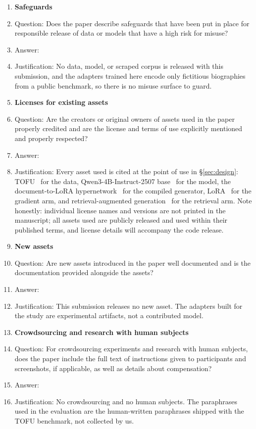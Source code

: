 \begin{enumerate}
\item {\bf Safeguards}
    \item[] Question: Does the paper describe safeguards that have been put in
    place for responsible release of data or models that have a high risk for
    misuse?
    \item[] Answer: \answerNA{}
    \item[] Justification: No data, model, or scraped corpus is released with
    this submission, and the adapters trained here encode only fictitious
    biographies from a public benchmark, so there is no misuse surface to guard.

\item {\bf Licenses for existing assets}
    \item[] Question: Are the creators or original owners of assets used in the
    paper properly credited and are the license and terms of use explicitly
    mentioned and properly respected?
    \item[] Answer: \answerYes{}
    \item[] Justification: Every asset used is cited at the point of use in
    \S\ref{sec:design}: TOFU~\citep{tofu} for the data, Qwen3-4B-Instruct-2507
    base~\citep{qwen3,qwen3-4b-2507} for the model, the document-to-LoRA
    hypernetwork~\citep{d2l} for the compiled generator, LoRA~\citep{lora} for
    the gradient arm, and retrieval-augmented generation~\citep{rag} for the
    retrieval arm. Note honestly: individual license names and versions are not
    printed in the manuscript; all assets used are publicly released and used
    within their published terms, and license details will accompany the code
    release.

\item {\bf New assets}
    \item[] Question: Are new assets introduced in the paper well documented and
    is the documentation provided alongside the assets?
    \item[] Answer: \answerNA{}
    \item[] Justification: This submission releases no new asset. The adapters
    built for the study are experimental artifacts, not a contributed model.

\item {\bf Crowdsourcing and research with human subjects}
    \item[] Question: For crowdsourcing experiments and research with human
    subjects, does the paper include the full text of instructions given to
    participants and screenshots, if applicable, as well as details about
    compensation?
    \item[] Answer: \answerNA{}
    \item[] Justification: No crowdsourcing and no human subjects. The
    paraphrases used in the evaluation are the human-written paraphrases shipped
    with the TOFU benchmark, not collected by us.


\end{enumerate}
